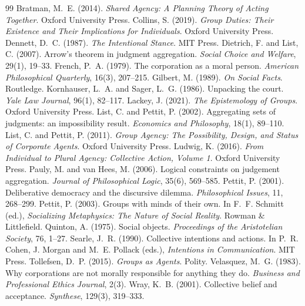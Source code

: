 \documentclass{situationist-preprint}
\begin{document}
\begin{thebibliography}{99}\small
{} Bratman, M.~E. (2014). \emph{Shared Agency: A Planning Theory of Acting Together}. Oxford University Press.
 Collins, S. (2019). \emph{Group Duties: Their Existence and Their Implications for Individuals}. Oxford University Press.
 Dennett, D.~C. (1987). \emph{The Intentional Stance}. MIT Press.
 Dietrich, F. and List, C. (2007). Arrow's theorem in judgment aggregation. \emph{Social Choice and Welfare}, 29(1), 19--33.
 French, P.~A. (1979). The corporation as a moral person. \emph{American Philosophical Quarterly}, 16(3), 207--215.
 Gilbert, M. (1989). \emph{On Social Facts}. Routledge.
 Kornhauser, L.~A. and Sager, L.~G. (1986). Unpacking the court. \emph{Yale Law Journal}, 96(1), 82--117.
 Lackey, J. (2021). \emph{The Epistemology of Groups}. Oxford University Press.
 List, C. and Pettit, P. (2002). Aggregating sets of judgments: an impossibility result. \emph{Economics and Philosophy}, 18(1), 89--110.
 List, C. and Pettit, P. (2011). \emph{Group Agency: The Possibility, Design, and Status of Corporate Agents}. Oxford University Press.
 Ludwig, K. (2016). \emph{From Individual to Plural Agency: Collective Action, Volume 1}. Oxford University Press.
 Pauly, M. and van Hees, M. (2006). Logical constraints on judgement aggregation. \emph{Journal of Philosophical Logic}, 35(6), 569--585.
 Pettit, P. (2001). Deliberative democracy and the discursive dilemma. \emph{Philosophical Issues}, 11, 268--299.
 Pettit, P. (2003). Groups with minds of their own. In F.~F. Schmitt (ed.), \emph{Socializing Metaphysics: The Nature of Social Reality}. Rowman \& Littlefield.
 Quinton, A. (1975). Social objects. \emph{Proceedings of the Aristotelian Society}, 76, 1--27.
 Searle, J.~R. (1990). Collective intentions and actions. In P.~R. Cohen, J. Morgan and M.~E. Pollack (eds.), \emph{Intentions in Communication}. MIT Press.
 Tollefsen, D.~P. (2015). \emph{Groups as Agents}. Polity.
 Velasquez, M.~G. (1983). Why corporations are not morally responsible for anything they do. \emph{Business and Professional Ethics Journal}, 2(3).
 Wray, K.~B. (2001). Collective belief and acceptance. \emph{Synthese}, 129(3), 319--333.
\end{thebibliography}
\end{document}
